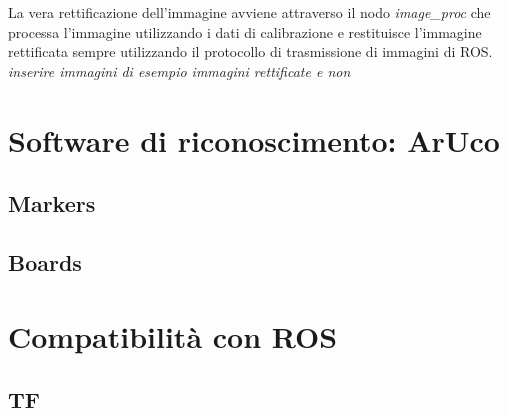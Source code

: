 	La vera rettificazione dell'immagine avviene attraverso il nodo \emph{image\_proc} che processa l'immagine utilizzando i dati di calibrazione e restituisce l'immagine rettificata sempre utilizzando il protocollo di trasmissione di immagini di ROS.
	\huge
	 \emph{inserire immagini di esempio immagini rettificate e non}
	 \normalsize
	 
\section{Software di riconoscimento: ArUco}
	
\subsection{Markers}
\subsection{Boards}
\section{Compatibilit\`a con ROS}
\subsection{TF}